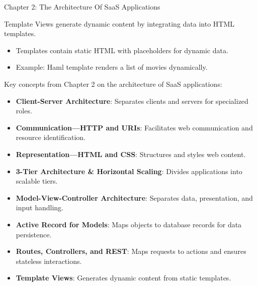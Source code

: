 \begin{notes}{Chapter 2: The Architecture Of SaaS Applications}
\begin{highlight}
        Template Views generate dynamic content by integrating data into HTML templates.
        
        \begin{itemize}
            \item Templates contain static HTML with placeholders for dynamic data.
            \item Example: Haml template renders a list of movies dynamically.
        \end{itemize}
    
    \end{highlight}
    
    \begin{highlight}
    
        Key concepts from Chapter 2 on the architecture of SaaS applications:
        
        \begin{itemize}
            \item \textbf{Client-Server Architecture}: Separates clients and servers for specialized roles.
            \item \textbf{Communication—HTTP and URIs}: Facilitates web communication and resource identification.
            \item \textbf{Representation—HTML and CSS}: Structures and styles web content.
            \item \textbf{3-Tier Architecture & Horizontal Scaling}: Divides applications into scalable tiers.
            \item \textbf{Model-View-Controller Architecture}: Separates data, presentation, and input handling.
            \item \textbf{Active Record for Models}: Maps objects to database records for data persistence.
            \item \textbf{Routes, Controllers, and REST}: Maps requests to actions and ensures stateless interactions.
            \item \textbf{Template Views}: Generates dynamic content from static templates.
        \end{itemize}
        
    \end{highlight}
\end{notes}